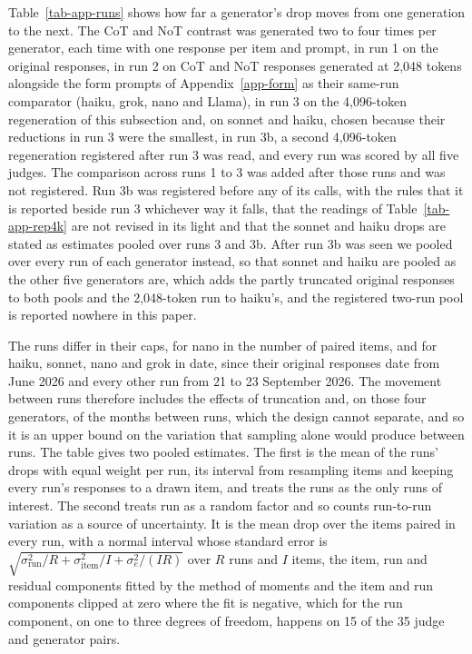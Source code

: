 Table~\ref{tab-app-runs} shows how far a generator's drop moves from one
generation to the next. The CoT and NoT contrast was generated two to four
times per generator, each time with one response per item and prompt, in run
1 on the original responses, in run 2 on CoT and NoT responses generated at
2,048 tokens alongside the form prompts of Appendix~\ref{app-form} as their
same-run comparator (haiku, grok, nano and Llama), in run 3 on the
4,096-token regeneration of this subsection and, on sonnet and haiku, chosen
because their reductions in run 3 were the smallest, in run 3b, a second
4,096-token regeneration registered after run 3 was read, and every run was
scored by all five judges.
The comparison across runs 1 to 3 was added after those runs and was not
registered. Run 3b was registered before any of its calls, with the rules
that it is reported beside run 3 whichever way it falls, that the readings
of Table~\ref{tab-app-rep4k} are not revised in its light and that the sonnet
and haiku drops are stated as estimates pooled over runs 3 and 3b. After run
3b was seen we pooled over every run of each generator instead, so that
sonnet and haiku are pooled as the other five generators are, which adds the
partly truncated original responses to both pools and the 2,048-token run to
haiku's, and the registered two-run pool is reported nowhere in this paper.

The runs differ in their caps, for nano in the number of paired items, and
for haiku, sonnet, nano and grok in date, since their original responses date
from June 2026 and every other run from 21 to 23 September 2026. The movement
between runs therefore includes the effects of truncation and, on those four
generators, of the months between runs, which the design cannot separate, and
so it is an upper bound on the variation that sampling alone would produce
between runs. The table gives two pooled
estimates. The first is the mean of the runs' drops with equal weight per
run, its interval from resampling items and keeping every run's responses to
a drawn item, and treats the runs as the only runs of interest. The second
treats run as a random factor and so counts run-to-run variation as a source
of uncertainty. It is the mean drop over the items paired in every run, with
a normal interval whose standard error is
$\sqrt{\sigma^2_{\mathrm{run}}/R + \sigma^2_{\mathrm{item}}/I + \sigma^2_{e}/(IR)}$
over $R$ runs and $I$ items, the item, run and residual components fitted by
the method of moments and the item and run components clipped at zero where
the fit is negative, which for the run component, on one to three degrees of
freedom, happens on 15 of the 35 judge and generator pairs.

